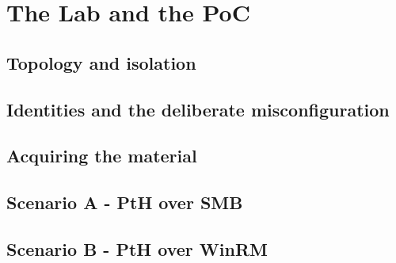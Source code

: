 \section{The Lab and the PoC}
\unwritten
\label{sec:poc}

\subsection{Topology and isolation}
\unwritten

\subsection{Identities and the deliberate misconfiguration}
\unwritten

\subsection{Acquiring the material}
\unwritten

\subsection{Scenario A - PtH over SMB}
\unwritten

\subsection{Scenario B - PtH over WinRM}
\unwritten

